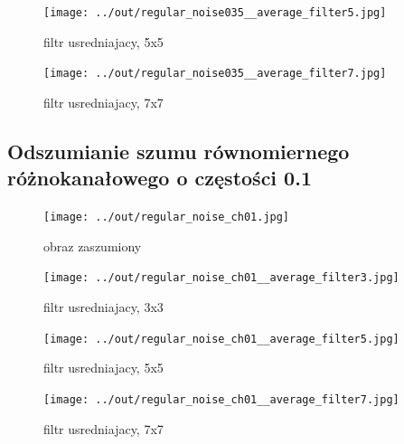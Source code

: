\documentclass[a4paper,12pt]{article}
\begin{document}
\begin{figure}[h!]
\begin{minipage}[t]{7.5cm}
\begin{center}
\texttt{[image: ../out/regular\_noise035\_\_average\_filter5.jpg]}
\caption{filtr usredniajacy, 5x5}
\end{center}
\end{minipage}
\hfill
\begin{minipage}[t]{7.5cm}
\begin{center}
\texttt{[image: ../out/regular\_noise035\_\_average\_filter7.jpg]}
\caption{filtr usredniajacy, 7x7}
\end{center}
\end{minipage}
\end{figure}


\newpage
\subsection{Odszumianie szumu równomiernego różnokanałowego o częstości 0.1}
\begin{figure}[h!]
\begin{minipage}[t]{7.5cm}
\begin{center}
\texttt{[image: ../out/regular\_noise\_ch01.jpg]}
\caption{obraz zaszumiony}
\end{center}
\end{minipage}
\hfill
\begin{minipage}[t]{7.5cm}
\begin{center}
\texttt{[image: ../out/regular\_noise\_ch01\_\_average\_filter3.jpg]}
\caption{filtr usredniajacy, 3x3}
\end{center}
\end{minipage}
\end{figure}

\begin{figure}[h!]
\begin{minipage}[t]{7.5cm}
\begin{center}
\texttt{[image: ../out/regular\_noise\_ch01\_\_average\_filter5.jpg]}
\caption{filtr usredniajacy, 5x5}
\end{center}
\end{minipage}
\hfill
\begin{minipage}[t]{7.5cm}
\begin{center}
\texttt{[image: ../out/regular\_noise\_ch01\_\_average\_filter7.jpg]}
\caption{filtr usredniajacy, 7x7}
\end{center}
\end{minipage}
\end{figure}
\end{document}
